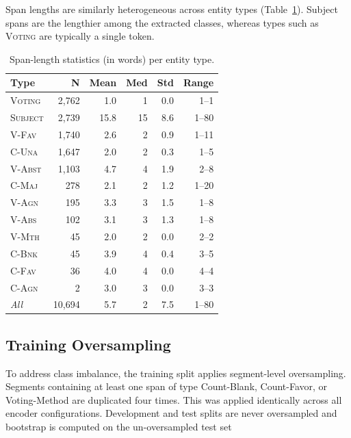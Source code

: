 \documentclass[11pt]{article}
\begin{document}
Span lengths are similarly heterogeneous across entity types (Table~\ref{tab:span-length}). Subject spans are the lengthier among the extracted classes, whereas types such as \textsc{Voting} are typically a single token. 
  
  \begin{table}[h]
  \centering
  \footnotesize
  \setlength{\tabcolsep}{3pt}
  \begin{tabular*}{\columnwidth}{@{\extracolsep{\fill}} l rrrrr @{}}
  \toprule
  \textbf{Type} & \textbf{N} & \textbf{Mean} & \textbf{Med} & \textbf{Std} & \textbf{Range} \\
  \midrule
  \textsc{Voting}   & 2{,}762 &  1.0 &  1 & 0.0 & 1--1  \\
  \textsc{Subject}  & 2{,}739 & 15.8 & 15 & 8.6 & 1--80 \\
  \textsc{V-Fav}    & 1{,}740 &  2.6 &  2 & 0.9 & 1--11 \\
  \textsc{C-Una}    & 1{,}647 &  2.0 &  2 & 0.3 & 1--5  \\
  \textsc{V-Abst}   & 1{,}103 &  4.7 &  4 & 1.9 & 2--8  \\
  \textsc{C-Maj}    &    278  &  2.1 &  2 & 1.2 & 1--20 \\
  \textsc{V-Agn}    &    195  &  3.3 &  3 & 1.5 & 1--8  \\
  \textsc{V-Abs}    &    102  &  3.1 &  3 & 1.3 & 1--8  \\
  \textsc{V-Mth}    &     45  &  2.0 &  2 & 0.0 & 2--2  \\
  \textsc{C-Bnk}    &     45  &  3.9 &  4 & 0.4 & 3--5  \\
  \textsc{C-Fav}    &     36  &  4.0 &  4 & 0.0 & 4--4  \\
  \textsc{C-Agn}    &      2  &  3.0 &  3 & 0.0 & 3--3  \\
  \midrule
  \textit{All}      & 10{,}694 &  5.7 &  2 & 7.5 & 1--80 \\
  \bottomrule
  \end{tabular*}
  \caption{Span-length statistics (in words) per entity type.}
  \label{tab:span-length}
  \end{table}

\FloatBarrier
  
\subsection{Training Oversampling}
\label{app:dataset:preprocessing}

To address class imbalance, the training split applies segment-level oversampling. Segments containing at least one span of type Count-Blank, Count-Favor, or Voting-Method are duplicated four times. This was applied identically across all encoder configurations. Development and test splits are never oversampled and bootstrap is computed on the un-oversampled test set
\end{document}
